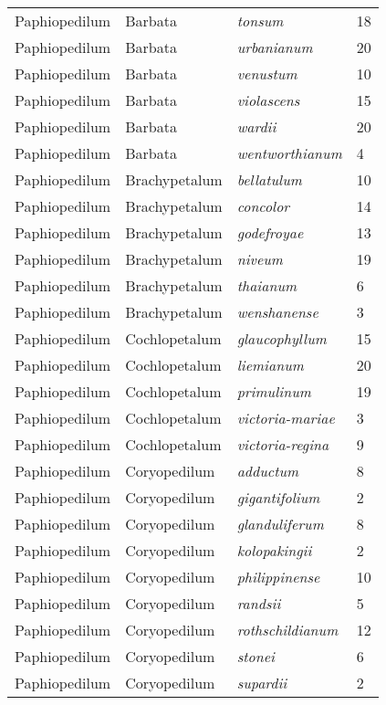 \documentclass[review,3p,twocolumn]{elsarticle}
\begin{document}
\begin{footnotesize}
\begin{longtable}{llll}
    Paphiopedilum & Barbata & \textit{tonsum} & 18 \\
    Paphiopedilum & Barbata & \textit{urbanianum} & 20 \\
    Paphiopedilum & Barbata & \textit{venustum} & 10 \\
    Paphiopedilum & Barbata & \textit{violascens} & 15 \\
    Paphiopedilum & Barbata & \textit{wardii} & 20 \\
    Paphiopedilum & Barbata & \textit{wentworthianum} & 4 \\
    Paphiopedilum & Brachypetalum & \textit{bellatulum} & 10 \\
    Paphiopedilum & Brachypetalum & \textit{concolor} & 14 \\
    Paphiopedilum & Brachypetalum & \textit{godefroyae} & 13 \\
    Paphiopedilum & Brachypetalum & \textit{niveum} & 19 \\
    Paphiopedilum & Brachypetalum & \textit{thaianum} & 6 \\
    Paphiopedilum & Brachypetalum & \textit{wenshanense} & 3 \\
    Paphiopedilum & Cochlopetalum & \textit{glaucophyllum} & 15 \\
    Paphiopedilum & Cochlopetalum & \textit{liemianum} & 20 \\
    Paphiopedilum & Cochlopetalum & \textit{primulinum} & 19 \\
    Paphiopedilum & Cochlopetalum & \textit{victoria-mariae} & 3 \\
    Paphiopedilum & Cochlopetalum & \textit{victoria-regina} & 9 \\
    Paphiopedilum & Coryopedilum & \textit{adductum} & 8 \\
    Paphiopedilum & Coryopedilum & \textit{gigantifolium} & 2 \\
    Paphiopedilum & Coryopedilum & \textit{glanduliferum} & 8 \\
    Paphiopedilum & Coryopedilum & \textit{kolopakingii} & 2 \\
    Paphiopedilum & Coryopedilum & \textit{philippinense} & 10 \\
    Paphiopedilum & Coryopedilum & \textit{randsii} & 5 \\
    Paphiopedilum & Coryopedilum & \textit{rothschildianum} & 12 \\
    Paphiopedilum & Coryopedilum & \textit{stonei} & 6 \\
    Paphiopedilum & Coryopedilum & \textit{supardii} & 2 \\

\end{longtable}
\end{footnotesize}
\end{document}
